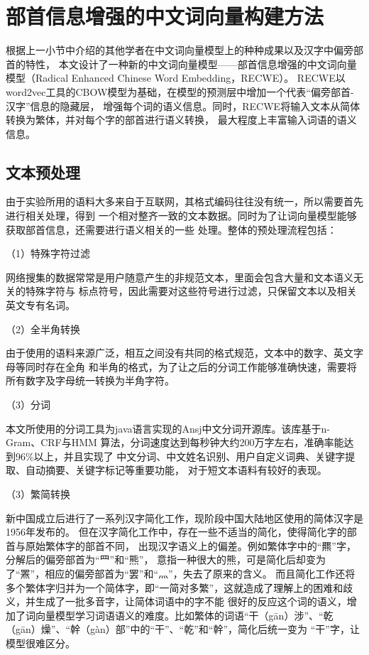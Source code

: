 \section{部首信息增强的中文词向量构建方法}
根据上一小节中介绍的其他学者在中文词向量模型上的种种成果以及汉字中偏旁部首的特性，
本文设计了一种新的中文词向量模型——部首信息增强的中文词向量模型（Radical Enhanced Chinese Word Embedding，RECWE）。
RECWE以word2vec工具的CBOW模型为基础，在模型的预测层中增加一个代表“偏旁部首-汉字”信息的隐藏层，
增强每个词的语义信息。同时，RECWE将输入文本从简体转换为繁体，并对每个字的部首进行语义转换，
最大程度上丰富输入词语的语义信息。
\subsection{文本预处理}
由于实验所用的语料大多来自于互联网，其格式编码往往没有统一，所以需要首先进行相关处理，得到
一个相对整齐一致的文本数据。同时为了让词向量模型能够获取部首信息，还需要进行语义相关的一些
处理。整体的预处理流程包括：

（1）特殊字符过滤

网络搜集的数据常常是用户随意产生的非规范文本，里面会包含大量和文本语义无关的特殊字符与
标点符号，因此需要对这些符号进行过滤，只保留文本以及相关英文专有名词。

（2）全半角转换

由于使用的语料来源广泛，相互之间没有共同的格式规范，文本中的数字、英文字母等同时存在全角
和半角的格式，为了让之后的分词工作能够准确快速，需要将所有数字及字母统一转换为半角字符。

（3）分词

本文所使用的分词工具为java语言实现的Ansj中文分词开源库。该库基于n-Gram、CRF与HMM
算法，分词速度达到每秒钟大约200万字左右，准确率能达到96\%以上，并且实现了
中文分词、中文姓名识别、用户自定义词典、关键字提取、自动摘要、关键字标记等重要功能，
对于短文本语料有较好的表现。

（3）繁简转换

新中国成立后进行了一系列汉字简化工作，现阶段中国大陆地区使用的简体汉字是1956年发布的。
但在汉字简化工作中，存在一些不适当的简化，使得简化字的部首与原始繁体字的部首不同，
出现汉字语义上的偏差。例如繁体字中的“羆”字，分解后的偏旁部首为“罒”和“熊”，
意指一种很大的熊，可是简化后却变为了“罴”，相应的偏旁部首为“罢”和“灬”，失去了原来的含义。
而且简化工作还将多个繁体字归并为一个简体字，即“一简对多繁”，这就造成了理解上的困难和歧义，并生成了一批多音字，让简体词语中的字不能
很好的反应这个词的语义，增加了词向量模型学习词语语义的难度。比如繁体的词语“干（gān）涉”、“乾（gān）燥”、“幹（gàn）部”中的“干”、“乾”和“幹”，简化后统一变为
“干”字，让模型很难区分。

